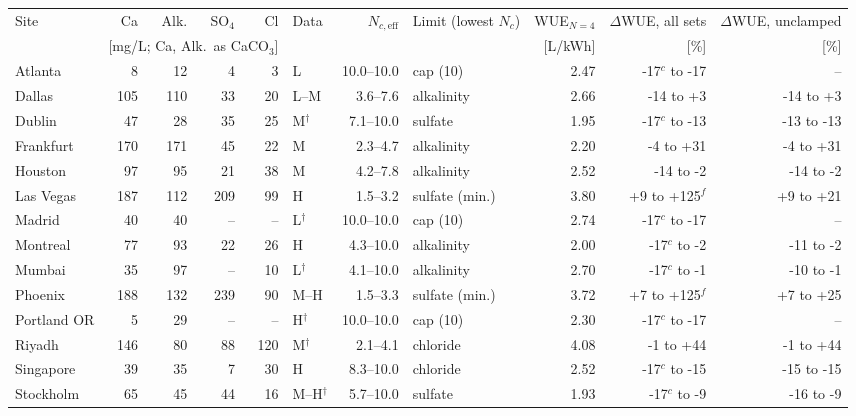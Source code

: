 \begin{tabular}{lrrrrlrlrrr}
\toprule
Site & Ca & Alk. & SO$_4$ & Cl & Data & $N_{c,\mathrm{eff}}$ & Limit (lowest $N_c$) & WUE$_{N=4}$ & $\Delta$WUE, all sets & $\Delta$WUE, unclamped \\
 & \multicolumn{4}{c}{[mg/L; Ca, Alk.\ as CaCO$_3$]} & & & & [L/kWh] & [\%] & [\%] \\
\midrule
Atlanta & 8 & 12 & 4 & 3 & L & 10.0--10.0 & cap (10) & 2.47 & -17$^c$ to -17 & -- \\
Dallas & 105 & 110 & 33 & 20 & L--M & 3.6--7.6 & alkalinity & 2.66 & -14 to +3 & -14 to +3 \\
Dublin & 47 & 28 & 35 & 25 & M$^\dagger$ & 7.1--10.0 & sulfate & 1.95 & -17$^c$ to -13 & -13 to -13 \\
Frankfurt & 170 & 171 & 45 & 22 & M & 2.3--4.7 & alkalinity & 2.20 & -4 to +31 & -4 to +31 \\
Houston & 97 & 95 & 21 & 38 & M & 4.2--7.8 & alkalinity & 2.52 & -14 to -2 & -14 to -2 \\
Las Vegas & 187 & 112 & 209 & 99 & H & 1.5--3.2 & sulfate (min.) & 3.80 & +9 to +125$^f$ & +9 to +21 \\
Madrid & 40 & 40 & -- & -- & L$^\dagger$ & 10.0--10.0 & cap (10) & 2.74 & -17$^c$ to -17 & -- \\
Montreal & 77 & 93 & 22 & 26 & H & 4.3--10.0 & alkalinity & 2.00 & -17$^c$ to -2 & -11 to -2 \\
Mumbai & 35 & 97 & -- & 10 & L$^\dagger$ & 4.1--10.0 & alkalinity & 2.70 & -17$^c$ to -1 & -10 to -1 \\
Phoenix & 188 & 132 & 239 & 90 & M--H & 1.5--3.3 & sulfate (min.) & 3.72 & +7 to +125$^f$ & +7 to +25 \\
Portland OR & 5 & 29 & -- & -- & H$^\dagger$ & 10.0--10.0 & cap (10) & 2.30 & -17$^c$ to -17 & -- \\
Riyadh & 146 & 80 & 88 & 120 & M$^\dagger$ & 2.1--4.1 & chloride & 4.08 & -1 to +44 & -1 to +44 \\
Singapore & 39 & 35 & 7 & 30 & H & 8.3--10.0 & chloride & 2.52 & -17$^c$ to -15 & -15 to -15 \\
Stockholm & 65 & 45 & 44 & 16 & M--H$^\dagger$ & 5.7--10.0 & sulfate & 1.93 & -17$^c$ to -9 & -16 to -9 \\
\bottomrule
\end{tabular}
